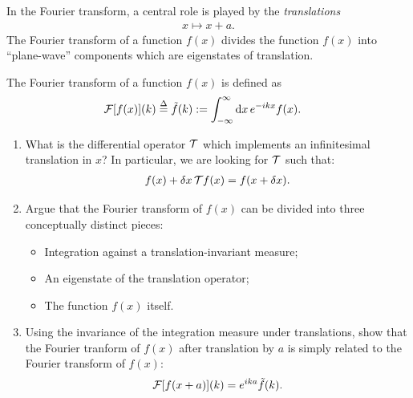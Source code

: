 \begin{subappendices}
\begin{exercise}
    In the Fourier transform, a central role is played by the \emph{translations}
    \begin{align}
        x \mapsto x + a
        .
    \end{align}
    The Fourier transform of a function \(f(x)\) divides the function \(f(x)\) into ``plane-wave'' components which are eigenstates of translation.

    The Fourier transform of a function \(f(x)\) is defined as
    \begin{align}
        \mathcal{F}[f(x)](k)
        \overset{\Delta}{=}
        \tilde f(k)
        &:=
        \int_{-\infty}^{\infty} \dd x \, e^{-ikx} f(x)
        .
    \end{align}

    \begin{enumerate}[label=\roman*)]
        \item
            What is the differential operator \(\mathcal{T}\) which implements an infinitesimal translation in \(x\)?
            In particular, we are looking for \(\mathcal{T}\) such that:
            \begin{align}
                f(x) + \delta x \, \mathcal{T} f(x) = f(x+\delta x)
                .
            \end{align}

        \item
            Argue that the Fourier transform of \(f(x)\) can be divided into three conceptually distinct pieces:
            \begin{itemize}
                \item
                    Integration against a translation-invariant measure;

                \item
                    An eigenstate of the translation operator;

                \item
                    The function \(f(x)\) itself.
            \end{itemize}

        \item
            Using the invariance of the integration measure under translations, show that the Fourier tranform of \(f(x)\) after translation by \(a\) is simply related to the Fourier transform of \(f(x)\):
            \begin{align}
                \mathcal{F}[f(x+a)](k) = e^{ika} \tilde f(k)
                .
            \end{align}


\end{enumerate}
\end{exercise}
\end{subappendices}
